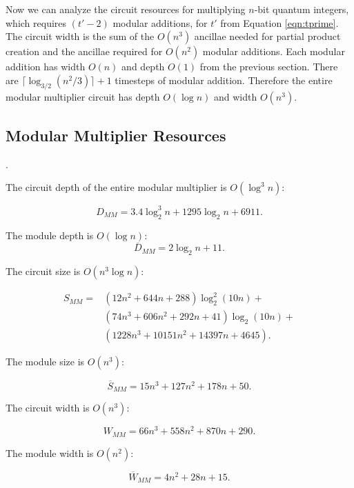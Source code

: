 Now we can analyze the circuit resources for multiplying $n$-bit
quantum integers, which requires $(t'-2)$ modular additions, for $t'$ from
Equation \ref{eqn:tprime}.
The circuit width is the sum of the $O(n^3)$ ancillae
needed for partial product creation and the ancillae required for $O(n^2)$
modular additions. Each modular addition has width $O(n)$ and depth $O(1)$
from the previous
section. There are
$\lceil \log_{3/2}(n^2 / 3) \rceil +1 $ timesteps of modular addition. Therefore
the entire modular multiplier circuit has depth $O(\log n)$ and width $O(n^3)$.

\subsection{Modular Multiplier Resources}
\label{subsec:mod-mult-resources}.

The circuit depth of the entire modular multiplier is $O(\log^3 n)$:

\begin{equation}
D_{MM} = 3.4 \log_2^3 n + 1295 \log_2 n + 6911\text{.}
\end{equation}

The module depth is $O(\log n)$:
\begin{equation}
\overline{D}_{MM} = 2\log_2 n + 11\text{.}
\end{equation}

The circuit size is $O(n^3\log n)$:

\begin{eqnarray}
S_{MM} = & (12n^2 + 644n + 288)\log_2^2 (10n) +\\
        & (74n^3 + 606n^2 + 292n + 41)\log_2 (10n) +\\
        & (1228n^3 + 10151n^2 + 14397n + 4645)\text{.}
\end{eqnarray}

The module size is $O(n^3)$:

\begin{equation}
\overline{S}_{MM} = 15n^3 + 127n^2 + 178n + 50{.}
\end{equation}

The circuit width is $O(n^3)$:

\begin{equation}
W_{MM} = 66n^3 + 558n^2 + 870n + 290\text{.}
\end{equation}

The module width is $O(n^2)$:

\begin{equation}
\overline{W}_{MM} = 4n^2 + 28n + 15\text{.}
\end{equation}

